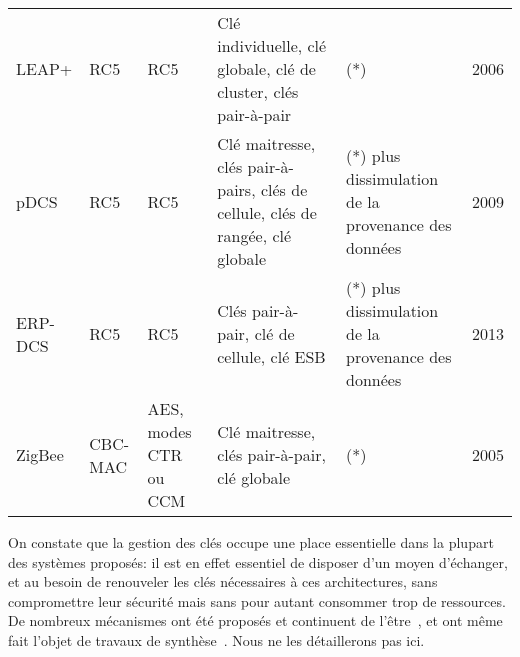 \begin{table}[ht]
\begin{footnotesize}
\begin{tabular}{@{}m{} m{} m{} m{} m{} m{}@{}}
            LEAP+                   & RC5                          & RC5                                & Clé individuelle, clé globale, clé de cluster, clés pair-à-pair                & (*)                                                                                   & 2006\\
            pDCS                    & RC5                          & RC5                                & Clé maitresse, clés pair-à-pairs, clés de cellule, clés de rangée, clé globale & (*) plus dissimulation de la provenance des données                                   & 2009\\
            ERP-DCS                 & RC5                          & RC5                                & Clés pair-à-pair, clé de cellule, clé ESB                                      & (*) plus dissimulation de la provenance des données                                   & 2013\\
            ZigBee                  & CBC-MAC                      & AES, modes CTR ou CCM              & Clé maitresse, clés pair-à-pair, clé globale                                   & (*)                                                                                   & 2005\\
            \bottomrule
        \end{tabular}
    \end{footnotesize}
\end{table}

On constate que la gestion des clés occupe une place essentielle dans la plupart des systèmes proposés: il est en effet essentiel de disposer d'un moyen d'échanger, et au besoin de renouveler les clés nécessaires à ces architectures, sans compromettre leur sécurité mais sans pour autant consommer trop de ressources.
De nombreux mécanismes ont été proposés et continuent de l'être~\cite{DSK10,BSK13}, et ont même fait l'objet de travaux de synthèse~\cite{HWMRKP06,XRSDHG07}.
Nous ne les détaillerons pas ici.

